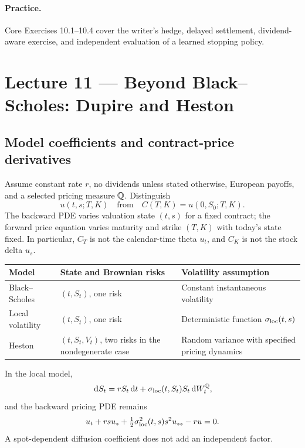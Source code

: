 \paragraph{Practice.} Core Exercises 10.1--10.4 cover the writer's
hedge, delayed settlement, dividend-aware exercise, and independent
evaluation of a learned stopping policy.

\section{Lecture 11 --- Beyond Black--Scholes: Dupire and Heston}
\label{syn:lecture11}

\subsection{Model coefficients and contract-price derivatives}
Assume constant rate \(r\), no dividends unless stated otherwise, European
payoffs, and a selected pricing measure \(\mathbb{Q}\). Distinguish
\[
u(t,s;T,K)\quad\text{from}\quad C(T,K)=u(0,S_0;T,K).
\]
The backward PDE varies valuation state \((t,s)\) for a fixed contract;
the forward price equation varies maturity and strike \((T,K)\) with
today's state fixed. In particular, \(C_T\) is not the calendar-time theta
\(u_t\), and \(C_K\) is not the stock delta \(u_s\).

\begin{center}
\begin{tabular}{L{.20\linewidth}L{.33\linewidth}L{.35\linewidth}}
\toprule Model & State and Brownian risks & Volatility assumption\\\midrule
Black--Scholes & \((t,S_t)\), one risk & Constant instantaneous volatility\\[.3em]
Local volatility & \((t,S_t)\), one risk & Deterministic function \(\sigma_{\rm loc}(t,s)\)\\[.3em]
Heston & \((t,S_t,V_t)\), two risks in the nondegenerate case & Random variance with specified pricing dynamics\\
\bottomrule
\end{tabular}
\end{center}
In the local model,
\[
\,\mathrm{d} S_t=rS_t\,\mathrm{d} t+\sigma_{\rm loc}(t,S_t)S_t\,\mathrm{d} W_t^{\mathbb{Q}},
\]
and the backward pricing PDE remains
\[
u_t+rsu_s+\tfrac12\sigma_{\rm loc}^2(t,s)s^2u_{ss}-ru=0.
\]
A spot-dependent diffusion coefficient does not add an independent factor.

